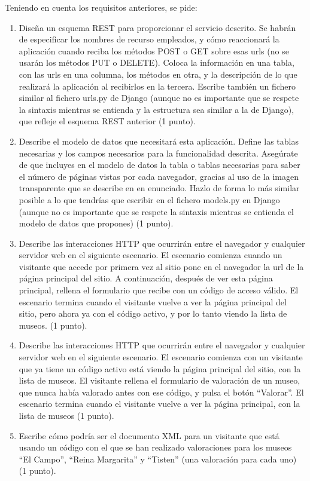 Teniendo en cuenta los requisitos anteriores, se pide:

\begin{enumerate}
\item Diseña un esquema REST para proporcionar el servicio descrito. Se habrán de especificar los nombres de recurso empleados, y cómo reaccionará la aplicación cuando reciba los métodos POST o GET sobre esas urls (no se usarán los métodos PUT o DELETE). Coloca la información en una tabla, con las urls en una columna, los métodos en otra, y la descripción de lo que realizará la aplicación al recibirlos en la tercera. Escribe también un fichero similar al fichero urls.py de Django (aunque no es importante que se respete la sintaxis mientras se entienda y la estructura sea similar a la de Django), que refleje el esquema REST anterior (1 punto).

\item Describe el modelo de datos que necesitará esta aplicación. Define las tablas necesarias y los campos necesarios para la funcionalidad descrita. Asegúrate de que incluyes en el modelo de datos la tabla o tablas necesarias para saber el número de páginas vistas por cada navegador, gracias al uso de la imagen transparente que se describe en en enunciado. Hazlo de forma lo más similar posible a lo que tendrías que escribir en el fichero models.py en Django (aunque no es importante que se respete la sintaxis mientras se entienda el modelo de datos que propones) (1 punto).

\item Describe las interacciones HTTP que ocurrirán entre el navegador y cualquier servidor web en el siguiente escenario. El escenario comienza cuando un visitante que accede por primera vez al sitio pone en el navegador la url de la página principal del sitio. A continuación, después de ver esta página principal, rellena el formulario que recibe con un código de acceso válido. El escenario termina cuando el visitante vuelve a ver la página principal del sitio, pero ahora ya con el código activo, y por lo tanto viendo la lista de museos. (1 punto).

\item Describe las interacciones HTTP que ocurrirán entre el navegador y cualquier servidor web en el siguiente escenario. El escenario comienza con un visitante que ya tiene un código activo está viendo la página principal del sitio, con la lista de museos. El visitante rellena el formulario de valoración de un museo, que nunca había valorado antes con ese código, y pulsa el botón ``Valorar''. El escenario termina cuando el visitante vuelve a ver la página principal, con la lista de museos (1 punto).

\item Escribe cómo podría ser el documento XML para un visitante que está usando un código con el que se han realizado valoraciones para los museos ``El Campo'', ``Reina Margarita'' y ``Tisten'' (una valoración para cada uno) (1 punto).
\end{enumerate}

